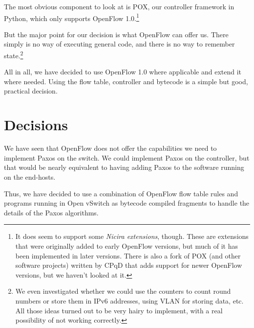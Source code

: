 The most obvious component to look at is POX, our controller framework in
Python, which only supports OpenFlow 1.0.\footnote{It does seem to support
some \textit{Nicira extensions}, though.  These are extensions that were originally added to
early OpenFlow versions, but much of it has been implemented in later
versions.  There is also a fork of POX (and other software projects) written
by CPqD that adds support for newer OpenFlow versions, but we haven't looked
at it.}

But the major point for our decision is what OpenFlow can offer us.
There simply is no way of executing general code, and there is no way to
remember state.\footnote{We even investigated whether we could use the
counters to count round numbers or store them in IPv6 addresses, using VLAN
for storing data, etc.  All those ideas turned out to be very hairy to
implement, with a real possibility of not working correctly.}

All in all, we have decided to use OpenFlow 1.0 where applicable and extend
it where needed.  Using the flow table, controller and bytecode is a simple
but good, practical decision.


\section{Decisions}

We have seen that OpenFlow does not offer the capabilities we need to
implement Paxos on the switch.  We could implement Paxos on the controller,
but that would be nearly equivalent to having adding Paxos to the software
running on the end-hosts.

Thus, we have decided to use a combination of OpenFlow flow table rules and
programs running in Open vSwitch as bytecode compiled
fragments to handle the details of the Paxos
algorithms.


